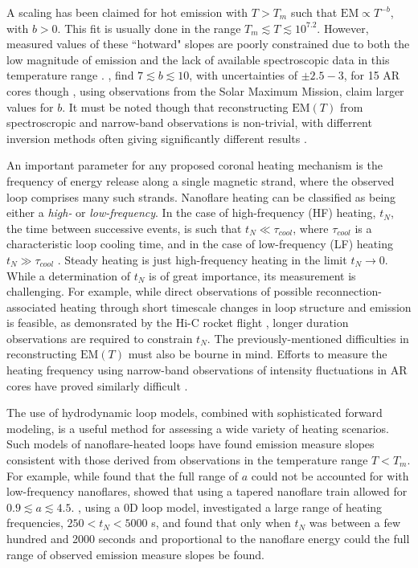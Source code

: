 \documentclass[preprint,linenumbers]{aastex}
\begin{document}
	\par A scaling has been claimed for hot emission with $T>T_m$ such that $\mathrm{EM}\propto T^{-b}$, with $b>0$. This fit is usually done in the range $T_m\lesssim T\lesssim10^{7.2}$. However, measured values of these ``hotward" slopes are poorly constrained due to both the low magnitude of emission and the lack of available spectroscopic data in this temperature range \citep{winebarger_defining_2012}. \citet{warren_systematic_2012}, find $7\lesssim b\lesssim10$, with uncertainties of $\pm2.5-3$, for 15 AR cores though \citet{del_zanna_elemental_2014}, using observations from the Solar Maximum Mission, claim larger values for $b$. It must be noted though that reconstructing $\mathrm{EM}(T)$ from spectroscropic and narrow-band observations is non-trivial, with differrent inversion methods often giving significantly different results \citep{landi_monte_2012,guennou_can_2013,aschwanden_benchmark_2015}.
	\par An important parameter for any proposed coronal heating mechanism is the frequency of energy release along a single magnetic strand, where the observed loop comprises many such strands. Nanoflare heating can be classified as being either a \textit{high-} or \textit{low-frequency}. In the case of high-frequency (HF) heating, $t_N$, the time between successive events, is such that $t_N\ll\tau_{cool}$, where $\tau_{cool}$ is a characteristic loop cooling time, and in the case of low-frequency (LF) heating $t_N\gg\tau_{cool}$ \citep{mulu-moore_can_2011,warren_constraints_2011,bradshaw_diagnosing_2012,reep_diagnosing_2013,cargill_modelling_2015}. Steady heating is just high-frequency heating in the limit $t_N\to0$. While a determination of $t_N$ is of great importance, its measurement is challenging. For example, while direct observations of possible reconnection-associated heating through short timescale changes in loop structure and emission is feasible, as demonsrated by the Hi-C rocket flight \citep{cirtain_energy_2013,cargill_solar_2013}, longer duration observations are required to constrain $t_N$. The previously-mentioned difficulties in reconstructing $\mathrm{EM}(T)$ must also be bourne in mind. Efforts to measure the heating frequency using narrow-band observations of intensity fluctuations in AR cores  have proved similarly difficult \citep{ugarte-urra_determining_2014}.
	\par The use of hydrodynamic loop models, combined with sophisticated forward modeling, is a useful method for assessing a wide variety of heating scenarios. Such models of nanoflare-heated loops have found emission measure slopes consistent with those derived from observations in the temperature range $T<T_m$. For example, while \citet{bradshaw_diagnosing_2012} found that the full range of $a$ could not be accounted for with low-frequency nanoflares, \citet{reep_diagnosing_2013} showed that using a tapered nanoflare train allowed for $0.9\lesssim a\lesssim4.5$. \citet{cargill_active_2014}, using a 0D loop model, investigated a large range of heating frequencies, $250<t_N<5000$ s, and found that only when $t_N$ was between a few hundred and 2000 seconds and proportional to the nanoflare energy could the full range of observed emission measure slopes be found. 
\end{document}
